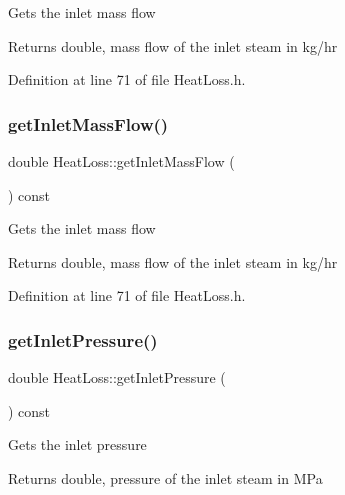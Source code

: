 Gets the inlet mass flow \begin{DoxyReturn}{Returns}
double, mass flow of the inlet steam in kg/hr 
\end{DoxyReturn}


Definition at line 71 of file Heat\+Loss.\+h.

\mbox{\label{class_heat_loss_ad11a428f99a4945628f66adecb88bf5a}} 
\subsubsection{\texorpdfstring{get\+Inlet\+Mass\+Flow()}{getInletMassFlow()}\hspace{0.1cm}{\footnotesize\ttfamily [3/3]}}
{\footnotesize\ttfamily double Heat\+Loss\+::get\+Inlet\+Mass\+Flow (\begin{DoxyParamCaption}{ }\end{DoxyParamCaption}) const\hspace{0.3cm}{\ttfamily [inline]}}

Gets the inlet mass flow \begin{DoxyReturn}{Returns}
double, mass flow of the inlet steam in kg/hr 
\end{DoxyReturn}


Definition at line 71 of file Heat\+Loss.\+h.

\mbox{\label{class_heat_loss_a09e6e05477fd6794ea7f42bb43da2f50}} 
\subsubsection{\texorpdfstring{get\+Inlet\+Pressure()}{getInletPressure()}\hspace{0.1cm}{\footnotesize\ttfamily [1/3]}}
{\footnotesize\ttfamily double Heat\+Loss\+::get\+Inlet\+Pressure (\begin{DoxyParamCaption}{ }\end{DoxyParamCaption}) const\hspace{0.3cm}{\ttfamily [inline]}}

Gets the inlet pressure \begin{DoxyReturn}{Returns}
double, pressure of the inlet steam in M\+Pa 
\end{DoxyReturn}


